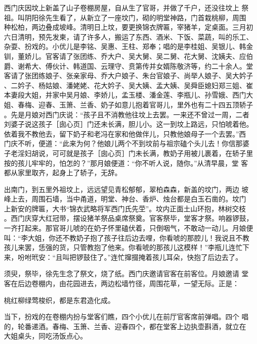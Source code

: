 西门庆因坟上新盖了山子卷棚房屋，自从生了官哥，并做了千户，还没往坟上
祭祖。叫阴阳徐先生看了，从新立了一座坟门，砌的明堂神路，门首栽桃柳，周围
种松柏，两边叠成坡峰。清明日上坟，要更换锦衣牌匾，宰猪羊，定桌面。三月初
六日清明，预先发柬，请了许多人，搬运了东西、酒米、下饭、菜蔬，叫的乐工、
杂耍、扮戏的。小优儿是李铭、吴惠、王柱、郑奉；唱的是李桂姐、吴银儿、韩金
钏，董娇儿。官客请了张团练、乔大户、吴大舅、吴二舅、花大舅、沈姨夫、应伯
爵、谢希大、傅伙计、韩道国、云理守、贲第传并女婿陈敬济等，约二十余人。堂
客请了张团练娘子、张亲家母、乔大户娘子、朱台官娘子、尚举人娘子、吴大妗子
、二妗子、杨姑娘、潘姥姥、花大妗子、吴大姨、孟大姨、吴舜臣媳妇郑三姐、崔
本妻段大姐，并家中吴月娘、李娇儿，孟玉楼、潘金莲、李瓶儿、孙雪娥、西门大
姐、春梅、迎春、玉箫、兰香、奶子如意儿抱着官哥儿，里外也有二十四五顶轿子
。先是月娘对西门庆说：“孩子且不消教他往坟上去罢。一来还不曾过一周，二者
刘婆子说这孩子［囱心页］门还未长满，胆儿小。这一到坟上路远，只怕唬着他。
依着我不教他去，留下奶子和老冯在家和他做伴儿，只教他娘母子一个去罢。”西
门庆不听，便道：“此来为何？他娘儿两个不到坟前与祖宗磕个头儿去！你信那婆
子老淫妇胡说，可可就是孩子［囱心页］门未长满，教奶子用被儿裹着，在轿子里
按的孩儿牢牢的，怕怎的？”那月娘便道：“你不听人说，随你。”从清早晨，堂
客都从家里取齐，起身上了轿子，无辞。

出南门，到五里外祖坟上，远远望见青松郁郁，翠柏森森，新盖的坟门，两边
坡峰上去，周围石墙，当中甬道，明堂、神台、香炉、烛台都是白玉石凿的。坟门
上新安的牌匾，大书“锦衣武略将军西门氏先茔”。坟内正面土山环抱，林树交枝
。西门庆穿大红冠带，摆设猪羊祭品桌席祭奠。官客祭毕，堂客才祭。响器锣鼓，
一齐打起来。那官哥儿唬的在奶子怀里磕伏着，只倒咽气，不敢动一动儿。月娘便
叫：“李大姐，你还不教奶子抱了孩子往后边去哩，你看唬的那腔儿！我说且不教
孩儿来罢，恁强的货，只管教抱了他来。你看唬的那孩儿这模样！”李瓶儿连忙下
来，吩咐玳安：“且叫把锣鼓住了。”连忙撺掇掩着孩儿耳朵，快抱了后边去了。

须臾，祭毕，徐先生念了祭文，烧了纸。西门庆邀请官客在前客位。月娘邀请
堂客在后边卷棚内，由花园进去，两边松墙竹径，周围花草，一望无际。正是：

桃红柳绿莺梭织，都是东君造化成。

当下，扮戏的在卷棚内扮与堂客们瞧，四个小优儿在前厅官客席前弹唱。四个
唱的，轮番递酒。春梅、玉箫、兰香、迎春四个，都在堂客上边执壶斟酒，就立在
大姐桌头，同吃汤饭点心。

